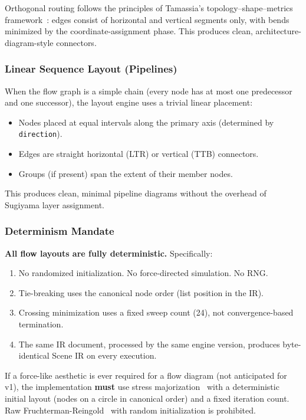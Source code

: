 Orthogonal routing follows the principles of Tamassia's topology--shape--metrics framework~\cite{tamassia1987}: edges consist of horizontal and vertical segments only, with bends minimized by the coordinate-assignment phase. This produces clean, architecture-diagram-style connectors.

\subsubsection{Linear Sequence Layout (Pipelines)}

When the flow graph is a simple chain (every node has at most one predecessor and one successor), the layout engine uses a trivial linear placement:

\begin{itemize}
  \item Nodes placed at equal intervals along the primary axis (determined by \texttt{direction}).
  \item Edges are straight horizontal (LTR) or vertical (TTB) connectors.
  \item Groups (if present) span the extent of their member nodes.
\end{itemize}

This produces clean, minimal pipeline diagrams without the overhead of Sugiyama layer assignment.

\subsubsection{Determinism Mandate}

\textbf{All flow layouts are fully deterministic.} Specifically:

\begin{enumerate}
  \item No randomized initialization. No force-directed simulation. No RNG.
  \item Tie-breaking uses the canonical node order (list position in the IR).
  \item Crossing minimization uses a fixed sweep count (24), not convergence-based termination.
  \item The same IR document, processed by the same engine version, produces byte-identical Scene IR on every execution.
\end{enumerate}

If a force-like aesthetic is ever required for a flow diagram (not anticipated for v1), the implementation \textbf{must} use stress majorization~\cite{gansnerStressMaj2004} with a deterministic initial layout (nodes on a circle in canonical order) and a fixed iteration count. Raw Fruchterman-Reingold~\cite{fruchterman1991} with random initialization is prohibited.

